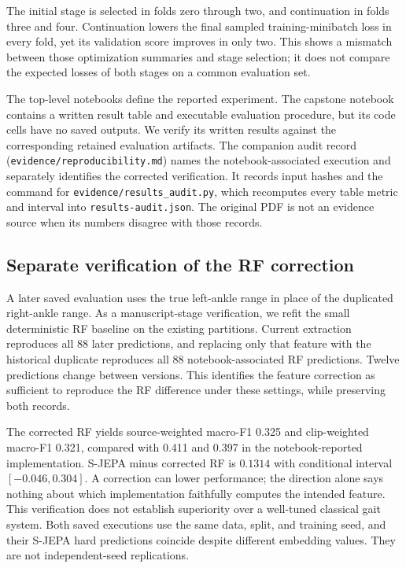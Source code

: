 \documentclass[10pt,twocolumn,letterpaper]{article}
\begin{document}
The initial stage is selected in folds zero through two, and continuation in folds three and four. Continuation lowers the final sampled training-minibatch loss in every fold, yet its validation score improves in only two. This shows a mismatch between those optimization summaries and stage selection; it does not compare the expected losses of both stages on a common evaluation set.

The top-level notebooks define the reported experiment. The capstone notebook contains a written result table and executable evaluation procedure, but its code cells have no saved outputs. We verify its written results against the corresponding retained evaluation artifacts. The companion audit record (\texttt{evidence/reproducibility.md}) names the notebook-associated execution and separately identifies the corrected verification. It records input hashes and the command for \texttt{evidence/results\_audit.py}, which recomputes every table metric and interval into \texttt{results-audit.json}. The original PDF is not an evidence source when its numbers disagree with those records.

\subsection{Separate verification of the RF correction}
A later saved evaluation uses the true left-ankle range in place of the duplicated right-ankle range. As a manuscript-stage verification, we refit the small deterministic RF baseline on the existing partitions. Current extraction reproduces all 88 later predictions, and replacing only that feature with the historical duplicate reproduces all 88 notebook-associated RF predictions. Twelve predictions change between versions. This identifies the feature correction as sufficient to reproduce the RF difference under these settings, while preserving both records.

The corrected RF yields source-weighted macro-F1 0.325 and clip-weighted macro-F1 0.321, compared with 0.411 and 0.397 in the notebook-reported implementation. S-JEPA minus corrected RF is $0.1314$ with conditional interval $[-0.046,0.304]$. A correction can lower performance; the direction alone says nothing about which implementation faithfully computes the intended feature. This verification does not establish superiority over a well-tuned classical gait system. Both saved executions use the same data, split, and training seed, and their S-JEPA hard predictions coincide despite different embedding values. They are not independent-seed replications.
\end{document}
